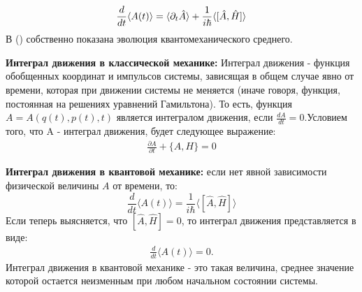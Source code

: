 \documentclass[__main__.tex]{subfiles}
\begin{document}
\begin{gather}
\llabel{_30:final}
\frac{d}{dt}\langle A(t) \rangle = \langle \partial_{t}\hat{A} \rangle + \frac{1}{i\hbar}\langle [\hat{A},\hat{H}] \rangle
\end{gather}
В () собственно показана эволюция квантомеханического среднего.

\textbf{Интеграл движения в классической механике:}
Интеграл движения - функция обобщенных координат и импульсов системы, зависящая в общем случае явно от времени, которая при движении системы не меняется (иначе говоря, функция, постоянная на решениях уравнений Гамильтона). То есть, функция $A = A(q(t),p(t),t)$ является интегралом движения, если $\frac{dA}{dt} = 0$.Условием того, что A - интеграл движения, будет следующее выражение:
\begin{gather*}
\frac{\partial A}{\partial t} + \{A,H\} = 0
\end{gather*}

\textbf{Интеграл движения в квантовой механике:} если нет явной зависимости физической величины $A$ от времени, то:
$$
\frac{d}{dt}\langle A(t) \rangle =\frac{1}{i\hbar}\langle [\hat{A},\hat{H}] \rangle
$$
Если теперь выясняется, что $ [\hat{A},\hat{H}]=0$, то интеграл движения представляется в виде:
\begin{gather*}
\frac{d}{dt}\langle A(t) \rangle=0.
\end{gather*}
Интеграл движения в квантовой механике - это такая величина, среднее значение которой остается неизменным при любом начальном состоянии системы.
\end{document}
